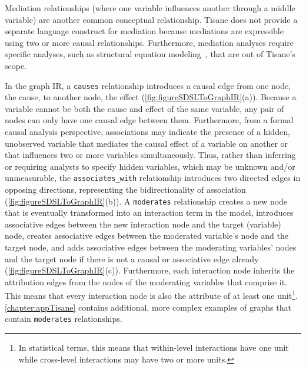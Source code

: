 \enlargethispage{-12pt}


Mediation relationships (where one variable influences another through a middle variable) are another common conceptual relationship. Tisane does
not provide a separate language construct for %
mediation because mediations are expressible using two or more causal
relationships. Furthermore, mediation analyses require specific analyses, such
as structural equation modeling~\cite{hoyle1995SEM}, that are out of Tisane's
scope.

In the graph IR, a \texttt{causes} relationship introduces a causal edge from
one node, the cause, to another node, the effect (\autoref{fig:figureSDSLToGraphIR}(a)). Because a
variable cannot be both the cause and effect of the same variable, any pair of
nodes can only have one causal edge between them. Furthermore, from a formal
causal analysis perspective, associations may indicate the presence of a hidden,
unobserved variable that mediates the causal effect of a variable on another or
that influences two or more variables simultaneously. Thus, rather than
inferring or requiring analysts to specify hidden variables, which may be
unknown and/or unmeasurable, the \texttt{associates\_with} relationship introduces two directed edges in
opposing directions, representing the bidirectionality of association (\autoref{fig:figureSDSLToGraphIR}(b)). A \texttt{moderates}
relationship creates a new node that is eventually transformed into an interaction term in the model, introduces associative edges between the new
interaction node and the target (variable) node, creates associative edges between the moderated variable's node and the target node, and adds associative
edges between the moderating variables' nodes and the
target node if there is not a causal or associative edge already (\autoref{fig:figureSDSLToGraphIR}(c)).
Furthermore, each interaction node inherits the attribution edges from the nodes of the
\nobreak moderating variables that comprise it. This means that every interaction node is
also the attribute of
at least one unit\footnote{In statistical terms, this
means that within-level interactions have one unit while cross-level
interactions may have two or more units.}. \autoref{chapter:appTisane} contains additional, more complex examples of graphs that contain \texttt{moderates} relationships.

\figureSDSLToGraphIR


